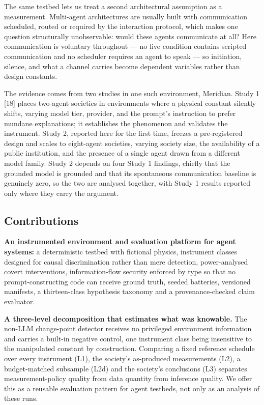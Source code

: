 \documentclass[pdflatex,sn-basic]{sn-jnl}
\begin{document}
The same testbed lets us treat a second architectural assumption as a measurement. Multi-agent
architectures are usually built with communication scheduled, routed or required by the
interaction protocol, which makes one question structurally unobservable: would these agents
communicate at all? Here communication is voluntary throughout --- no live condition contains
scripted communication and no scheduler requires an agent to speak --- so initiation, silence,
and what a channel carries become dependent variables rather than design constants.

The evidence comes from two studies in one such environment, Meridian. Study 1 {[}18{]} places
two-agent societies in environments where a physical constant silently shifts, varying model
tier, provider, and the prompt's instruction to prefer mundane explanations; it establishes
the phenomenon and validates the instrument. Study 2, reported here for the first time,
freezes a pre-registered design and scales to eight-agent societies, varying society size, the
availability of a public institution, and the presence of a single agent drawn from a
different model family. Study 2 depends on four Study 1 findings, chiefly that the grounded
model is grounded and that its spontaneous communication baseline is genuinely zero, so the
two are analysed together, with Study 1 results reported only where they carry the argument.

\hypertarget{contributions}{%
\subsection{Contributions}\label{contributions}}

\textbf{An instrumented environment and evaluation platform for agent systems:} a deterministic
testbed with fictional physics, instrument classes designed for causal discrimination rather
than mere detection, power-analysed covert interventions, information-flow security enforced
by type so that no prompt-constructing code can receive ground truth, seeded batteries,
versioned manifests, a thirteen-class hypothesis taxonomy and a provenance-checked claim
evaluator.

\textbf{A three-level decomposition that estimates what was knowable.} The non-LLM change-point
detector receives no privileged environment information and carries a built-in negative
control, one instrument class being insensitive to the manipulated constant by construction.
Comparing a fixed reference schedule over every instrument (L1), the society's as-produced
measurements (L2), a budget-matched subsample (L2d) and the society's conclusions (L3)
separates measurement-policy quality from data quantity from inference quality. We offer this
as a reusable evaluation pattern for agent testbeds, not only as an analysis of these runs.
\end{document}
